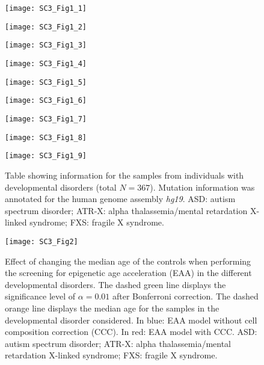 \begin{figure}[htbp!]
	\setcounter{figure}{0}
	\centering    
	\texttt{[image: SC3\_Fig1\_1]}
\end{figure}
\begin{figure}[htbp!]
	\centering    
	\texttt{[image: SC3\_Fig1\_2]}
\end{figure}
\begin{figure}[htbp!]
	\centering    
	\texttt{[image: SC3\_Fig1\_3]}
\end{figure}
\begin{figure}[htbp!]
	\centering    
	\texttt{[image: SC3\_Fig1\_4]}
\end{figure}
\begin{figure}[htbp!]
	\centering    
	\texttt{[image: SC3\_Fig1\_5]}
\end{figure}
\begin{figure}[htbp!]
	\centering    
	\texttt{[image: SC3\_Fig1\_6]}
\end{figure}
\begin{figure}[htbp!]
	\centering    
	\texttt{[image: SC3\_Fig1\_7]}
\end{figure}
\begin{figure}[htbp!]
	\centering    
	\texttt{[image: SC3\_Fig1\_8]}
\end{figure}
\begin{figure}[htbp!]
	\centering
	\vspace*{-40mm}    
	\texttt{[image: SC3\_Fig1\_9]}
	\caption[Table showing information for the individuals with developmental disorders]{Table showing information for the samples from individuals with developmental disorders (total $N=367$). Mutation information was annotated for the human genome assembly \textit{hg19}. \acrshort{ASD}: autism spectrum disorder; \acrshort{ATR-X}: alpha thalassemia/mental retardation X-linked syndrome; \acrshort{FXS}: fragile X syndrome.}
	\label{fig:sc3_fig1}
\end{figure}	

\begin{figure}[htbp!] 
	\centering    
	\texttt{[image: SC3\_Fig2]}
	\caption[Effect of changing the median age of the controls when performing the screening]{Effect of changing the median age of the controls when performing the screening for epigenetic age acceleration (EAA) in the different developmental disorders. The dashed green line displays the significance level of $\alpha = 0.01$ after Bonferroni correction. The dashed orange line displays the median age for the samples in the developmental disorder considered. In blue: EAA model without cell composition correction (CCC). In red: EAA model with CCC. \acrshort{ASD}: autism spectrum disorder; \acrshort{ATR-X}: alpha thalassemia/mental retardation X-linked syndrome; \acrshort{FXS}: fragile X syndrome.}
	\label{fig:sc3_fig2}
\end{figure}

